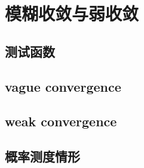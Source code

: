 \section{模糊收敛与弱收敛}
\label{b1:sec:1201}


\subsection{测试函数}
\label{b1:subsec:120101}

\subsection{vague convergence}
\label{b1:subsec:120102}

\subsection{weak convergence}
\label{b1:subsec:120103}

\subsection{概率测度情形}
\label{b1:subsec:120104}


